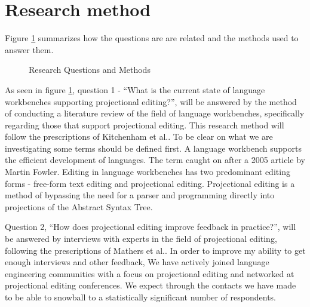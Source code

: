 \section{Research method}

Figure \ref{fig:Research_Questions} summarizes how the questions are are related and the methods used to answer them.
\begin{figure}[H]
    \centering
    \caption{Research Questions and Methods}
    \label{fig:Research_Questions}
\end{figure}

As seen in figure \ref{fig:Research_Questions}, question 1 - ``What is the current state of language workbenches supporting projectional editing?'', will be answered by the method of conducting a literature review of the field of language workbenches, specifically regarding those that support projectional editing. 
This research method will follow the prescriptions of Kitchenham et al.\cite{kitchenham2015evidence}.
To be clear on what we are investigating some terms should be defined first.
A language workbench supports the efficient development of languages. 
The term caught on after a 2005 article by Martin Fowler\cite{Fowler_lwb}. 
Editing in language workbenches has two predominant editing forms - free-form text editing and projectional editing\cite{erdweg2013state}.
Projectional editing is a method of bypassing the need for a parser and programming directly into projections of the Abstract Syntax Tree.

Question 2, ``How does projectional editing improve feedback in practice?'', will be answered by interviews with experts in the field of projectional editing, following the prescriptions of Mathers et al.\cite{mathers1998using}.
In order to improve my ability to get enough interviews and other feedback, We have actively joined language engineering communities with a focus on projectional editing and networked at projectional editing conferences.
We expect through the contacts we have made to be able to snowball to a statistically significant number of respondents.

